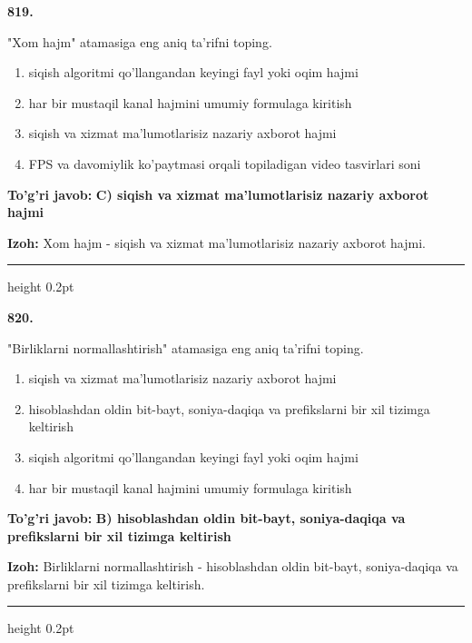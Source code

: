 \documentclass[10pt,a4paper,oneside]{article}
\begin{document}
\noindent\textbf{\color{ink}819.}
\par
"Xom hajm" atamasiga eng aniq ta'rifni toping.
\begin{enumerate}[label=\Alph*),leftmargin=9mm]
\item siqish algoritmi qo'llangandan keyingi fayl yoki oqim hajmi
\item har bir mustaqil kanal hajmini umumiy formulaga kiritish
\item siqish va xizmat ma'lumotlarisiz nazariy axborot hajmi
\item FPS va davomiylik ko'paytmasi orqali topiladigan video tasvirlari soni
\end{enumerate}
\begin{tcolorbox}[enhanced,breakable,colback=teal!4,colframe=teal!50!black,boxrule=0.5pt,arc=1.1mm,left=3mm,right=3mm,top=1.7mm,bottom=1.7mm,before skip=2mm,after skip=2mm]
\textbf{\color{teal}To'g'ri javob:} \textbf{C) siqish va xizmat ma'lumotlarisiz nazariy axborot hajmi}
\par\smallskip
\textbf{Izoh:} Xom hajm - siqish va xizmat ma'lumotlarisiz nazariy axborot hajmi.
\end{tcolorbox}
\vspace{2mm}\hrule height 0.2pt \vspace{3mm}

\noindent\textbf{\color{ink}820.}
\par
"Birliklarni normallashtirish" atamasiga eng aniq ta'rifni toping.
\begin{enumerate}[label=\Alph*),leftmargin=9mm]
\item siqish va xizmat ma'lumotlarisiz nazariy axborot hajmi
\item hisoblashdan oldin bit-bayt, soniya-daqiqa va prefikslarni bir xil tizimga keltirish
\item siqish algoritmi qo'llangandan keyingi fayl yoki oqim hajmi
\item har bir mustaqil kanal hajmini umumiy formulaga kiritish
\end{enumerate}
\begin{tcolorbox}[enhanced,breakable,colback=teal!4,colframe=teal!50!black,boxrule=0.5pt,arc=1.1mm,left=3mm,right=3mm,top=1.7mm,bottom=1.7mm,before skip=2mm,after skip=2mm]
\textbf{\color{teal}To'g'ri javob:} \textbf{B) hisoblashdan oldin bit-bayt, soniya-daqiqa va prefikslarni bir xil tizimga keltirish}
\par\smallskip
\textbf{Izoh:} Birliklarni normallashtirish - hisoblashdan oldin bit-bayt, soniya-daqiqa va prefikslarni bir xil tizimga keltirish.
\end{tcolorbox}
\vspace{2mm}\hrule height 0.2pt \vspace{3mm}
\end{document}

